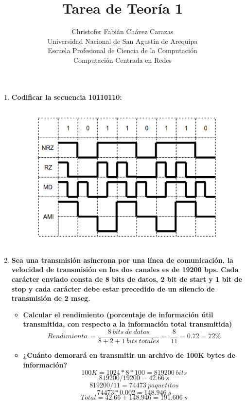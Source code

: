 \documentclass[a4paper,12pt]{article}
\begin{document}
\title{Tarea de Teoría 1}
\author{
Christofer Fabián Chávez Carazas \\
\small{Universidad Nacional de San Agustín de Arequipa} \\
\small{Escuela Profesional de Ciencia de la Computación} \\
\small{Computación Centrada en Redes}
}
\date{}

\maketitle

\begin{enumerate}
  \item \textbf{Codificar la secuencia 10110110:}
  \begin{figure}[H]
   \centering
   \includegraphics[scale = 0.6]{1.png}
  \end{figure}
  
  \item \textbf{Sea una transmisión asíncrona por una línea de comunicación, la velocidad de transmisión en los dos
  canales es de 19200 bps. Cada carácter enviado consta de 8 bits de datos, 2 bit de start y 1 bit de stop y
  cada carácter debe estar precedido de un silencio de transmisión de 2 mseg.}
  \begin{itemize}
   \item \textbf{Calcular el rendimiento (porcentaje de información útil transmitida, con respecto a la información total transmitida)}
   $$Rendimiento\:=\frac{8\: bits\:de\:datos}{8 + 2 + 1\: bits\:totales}= \:\frac{8}{11}=0.72 = 72\%$$
   \item \textbf{¿Cuánto demorará en transmitir un archivo de 100K bytes de información?}
   $$100K = 1024 * 8 * 100 = 819200\: bits$$
   $$819200/19200 = 42.66\:s$$
   $$819200/11 = 74473\:paquetitos$$
   $$74473 * 0.002 = 148.946\:s$$
   $$Total = 42.66 + 148.946 = 191.606\:s$$
  \end{itemize}
  

\end{enumerate}
\end{document}
